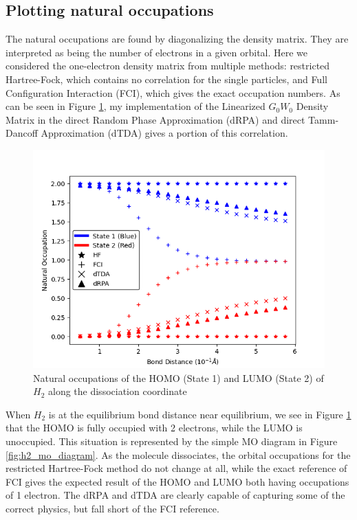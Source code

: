 \documentclass[12pt]{caltech_thesis}
\begin{document}
\subsection{Plotting natural occupations}
The natural occupations are found by diagonalizing the density matrix. They are interpreted as being the number of electrons in a given orbital.\autocite{szabo_modern_2012} Here we considered the one-electron density matrix from multiple methods: restricted Hartree-Fock, which contains no correlation for the single particles, and Full Configuration Interaction (FCI), which gives the exact occupation numbers. As can be seen in Figure \ref{fig:h2_dissociation}, my implementation of the Linearized $G_0W_0$ Density Matrix in the direct Random Phase Approximation (dRPA) and direct Tamm-Dancoff Approximation (dTDA) gives a portion of this correlation.
\begin{figure}[h]
    \centering
    \includegraphics[width=\textwidth]{h2_occupations.png}
\caption{Natural occupations of the HOMO (State 1) and LUMO (State 2) of $H_2$ along the dissociation coordinate}
\label{fig:h2_dissociation}
\end{figure}
When \(H_2\) is at the equilibrium bond distance near equilibrium, we see in Figure \ref{fig:h2_dissociation} that the HOMO is fully occupied with 2 electrons, while the LUMO is unoccupied. This situation is represented by the simple MO diagram in Figure \ref{fig:h2_mo_diagram}. As the molecule dissociates, the orbital occupations for the restricted Hartree-Fock method do not change at all, while the exact reference of FCI gives the expected result of the HOMO and LUMO both having occupations of 1 electron. The dRPA and dTDA are clearly capable of capturing some of the correct physics, but fall short of the FCI reference.
\end{document}

